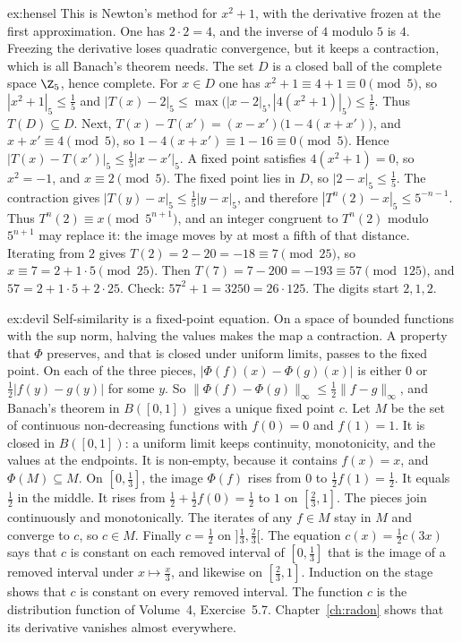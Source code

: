 \begin{solution}{ex:hensel}
\idea This is Newton's method for $x^2+1$, with the derivative frozen at the first approximation. One has $2\cdot2=4$, and the inverse of $4$ modulo $5$ is $4$. Freezing the derivative loses quadratic convergence, but it keeps a contraction, which is all Banach's theorem needs.
\writeup The set $D$ is a closed ball of the complete space $\Z_5$, hence complete. For $x\in D$ one has $x^2+1\equiv4+1\equiv0\pmod5$, so $|x^2+1|_5\le\frac15$ and $|T(x)-2|_5\le\max\bigl(|x-2|_5,|4(x^2+1)|_5\bigr)\le\frac15$. Thus $T(D)\subseteq D$. Next, $T(x)-T(x')=(x-x')\bigl(1-4(x+x')\bigr)$, and $x+x'\equiv4\pmod5$, so $1-4(x+x')\equiv1-16\equiv0\pmod5$. Hence $|T(x)-T(x')|_5\le\frac15|x-x'|_5$. A fixed point satisfies $4(x^2+1)=0$, so $x^2=-1$, and $x\equiv2\pmod5$. The fixed point lies in $D$, so $|2-x|_5\le\frac15$. The contraction gives $|T(y)-x|_5\le\frac15|y-x|_5$, and therefore $|T^n(2)-x|_5\le5^{-n-1}$. Thus $T^n(2)\equiv x\pmod{5^{n+1}}$, and an integer congruent to $T^n(2)$ modulo $5^{n+1}$ may replace it: the image moves by at most a fifth of that distance. Iterating from $2$ gives $T(2)=2-20=-18\equiv7\pmod{25}$, so $x\equiv7=2+1\cdot5\pmod{25}$. Then $T(7)=7-200=-193\equiv57\pmod{125}$, and $57=2+1\cdot5+2\cdot25$. Check: $57^2+1=3250=26\cdot125$. The digits start $2,1,2$.
\end{solution}

\begin{solution}{ex:devil}
\idea Self-similarity is a fixed-point equation. On a space of bounded functions with the sup norm, halving the values makes the map a contraction. A property that $\Phi$ preserves, and that is closed under uniform limits, passes to the fixed point.
\writeup On each of the three pieces, $|\Phi(f)(x)-\Phi(g)(x)|$ is either $0$ or $\frac12|f(y)-g(y)|$ for some $y$. So $\|\Phi(f)-\Phi(g)\|_\infty\le\frac12\|f-g\|_\infty$, and Banach's theorem in $B([0,1])$ gives a unique fixed point $c$. Let $M$ be the set of continuous non-decreasing functions with $f(0)=0$ and $f(1)=1$. It is closed in $B([0,1])$: a uniform limit keeps continuity, monotonicity, and the values at the endpoints. It is non-empty, because it contains $f(x)=x$, and $\Phi(M)\subseteq M$. On $[0,\frac13]$, the image $\Phi(f)$ rises from $0$ to $\frac12f(1)=\frac12$. It equals $\frac12$ in the middle. It rises from $\frac12+\frac12f(0)=\frac12$ to $1$ on $[\frac23,1]$. The pieces join continuously and monotonically. The iterates of any $f\in M$ stay in $M$ and converge to $c$, so $c\in M$. Finally $c=\frac12$ on $]\frac13,\frac23[$. The equation $c(x)=\frac12c(3x)$ says that $c$ is constant on each removed interval of $[0,\frac13]$ that is the image of a removed interval under $x\mapsto\frac x3$, and likewise on $[\frac23,1]$. Induction on the stage shows that $c$ is constant on every removed interval. The function $c$ is the distribution function of Volume~4, Exercise~5.7. Chapter~\ref{ch:radon} shows that its derivative vanishes almost everywhere.
\end{solution}


